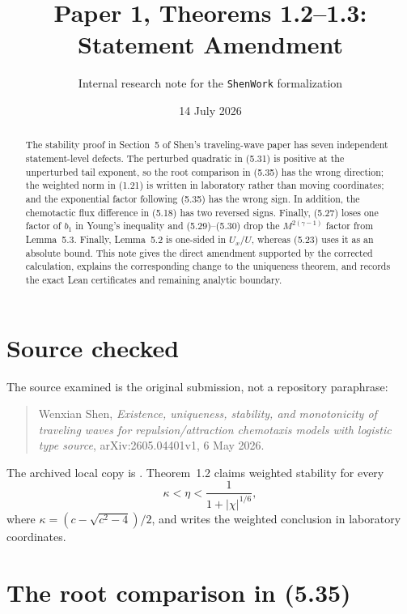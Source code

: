 \documentclass[11pt]{article}
\title{Paper 1, Theorems 1.2--1.3: Statement Amendment}
\author{Internal research note for the \texttt{ShenWork} formalization}
\date{14 July 2026}
\newcommand{\abs}[1]{\left\lvert #1\right\rvert}
\begin{document}
\maketitle

\begin{abstract}
The stability proof in Section~5 of Shen's traveling-wave paper has seven
independent statement-level defects.  The perturbed quadratic in (5.31) is
positive at the unperturbed tail exponent, so the root comparison in (5.35)
has the wrong direction; the weighted norm in (1.21) is written in laboratory
rather than moving coordinates; and the exponential factor following (5.35)
has the wrong sign.  In addition, the chemotactic flux difference in (5.18)
has two reversed signs.  Finally, (5.27) loses one factor of $b_1$ in
Young's inequality and (5.29)--(5.30) drop the
$M^{2(\gamma-1)}$ factor from Lemma~5.3.  Finally, Lemma~5.2 is
one-sided in $U_x/U$, whereas (5.23) uses it as an absolute bound.  This note gives the direct amendment supported by
the corrected calculation, explains the corresponding change to the
uniqueness theorem, and records the exact Lean certificates and remaining
analytic boundary.
\end{abstract}

\section{Source checked}

The source examined is the original submission, not a repository paraphrase:
\begin{quote}
Wenxian Shen, \emph{Existence, uniqueness, stability, and monotonicity of
traveling waves for repulsion/attraction chemotaxis models with logistic type
source}, arXiv:2605.04401v1, 6 May 2026.
\end{quote}
The archived local copy is .  Theorem~1.2 claims weighted
stability for every
\[
  \kappa<\eta<\frac{1}{1+\abs{\chi}^{1/6}},
\]
where $\kappa=(c-\sqrt{c^{2}-4})/2$, and writes the weighted conclusion in
laboratory coordinates.

\section{The root comparison in (5.35)}
\end{document}
